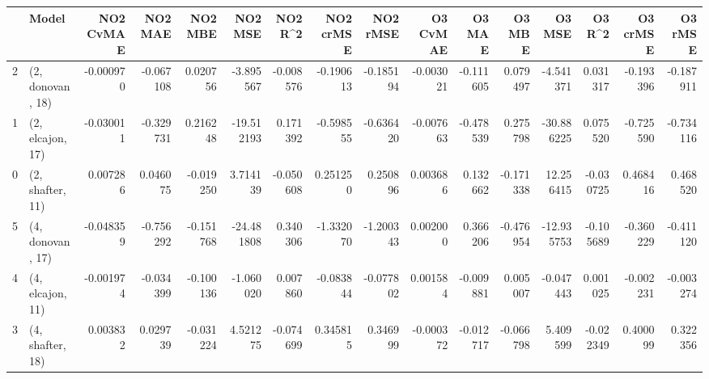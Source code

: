 \begin{tabular}{llrrrrrrrrrrrrrr}
\toprule
{} &             Model &  NO2 CvMAE &   NO2 MAE &   NO2 MBE &    NO2 MSE &   NO2 R\textasciicircum2 &  NO2 crMSE &  NO2 rMSE &  O3 CvMAE &    O3 MAE &    O3 MBE &     O3 MSE &    O3 R\textasciicircum2 &  O3 crMSE &   O3 rMSE \\
\midrule
2 &  (2, donovan, 18) &  -0.000970 & -0.067108 &  0.020756 &  -3.895567 & -0.008576 &  -0.190613 & -0.185194 & -0.003021 & -0.111605 &  0.079497 &  -4.541371 &  0.031317 & -0.193396 & -0.187911 \\
1 &  (2, elcajon, 17) &  -0.030011 & -0.329731 &  0.216248 & -19.512193 &  0.171392 &  -0.598555 & -0.636420 & -0.007663 & -0.478539 &  0.275798 & -30.886225 &  0.075520 & -0.725590 & -0.734116 \\
0 &  (2, shafter, 11) &   0.007286 &  0.046075 & -0.019250 &   3.714139 & -0.050608 &   0.251250 &  0.250896 &  0.003686 &  0.132662 & -0.171338 &  12.256415 & -0.030725 &  0.468416 &  0.468520 \\
5 &  (4, donovan, 17) &  -0.048359 & -0.756292 & -0.151768 & -24.481808 &  0.340306 &  -1.332070 & -1.200343 &  0.002000 &  0.366206 & -0.476954 & -12.935753 & -0.105689 & -0.360229 & -0.411120 \\
4 &  (4, elcajon, 11) &  -0.001974 & -0.034399 & -0.100136 &  -1.060020 &  0.007860 &  -0.083844 & -0.077802 &  0.001584 & -0.009881 &  0.005007 &  -0.047443 &  0.001025 & -0.002231 & -0.003274 \\
3 &  (4, shafter, 18) &   0.003832 &  0.029739 & -0.031224 &   4.521275 & -0.074699 &   0.345815 &  0.346999 & -0.000372 & -0.012717 & -0.066798 &   5.409599 & -0.022349 &  0.400099 &  0.322356 \\
\bottomrule
\end{tabular}
